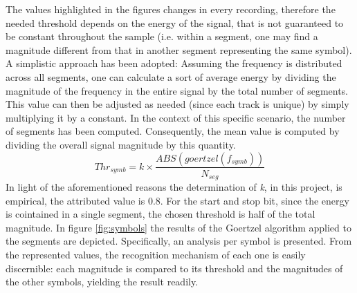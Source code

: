 The values highlighted in the figures changes in every recording, therefore the needed threshold depends on the energy of the signal, that is not guaranteed to be constant throughout the sample (i.e. within a segment, one may find a magnitude different from that in another segment representing the same symbol).
A simplistic approach has been adopted: Assuming the frequency is distributed across all segments, one can calculate a sort of average energy by dividing the magnitude of the frequency in the entire signal by the total number of segments. This value can then be adjusted as needed (since each track is unique) by simply multiplying it by a constant.
In the context of this specific scenario, the number of segments has been computed. Consequently, the mean value is computed by dividing the overall signal magnitude by this quantity. 
\[Thr_{symb} = k\times\frac{ABS(goertzel(f_{symb}))}{N_{seg}}\]
In light of the aforementioned reasons the determination of \textit{k}, in this project,  is empirical, the attributed value is 0.8. For the start and stop bit, since the energy is cointained in a single segment, the chosen threshold is half of the total magnitude.
In figure \ref{fig:symbols} the results of the Goertzel algorithm applied to the segments are depicted. Specifically, an analysis per symbol is presented. From the represented values, the recognition mechanism of each one is easily discernible: each magnitude is compared to its threshold and the magnitudes of the other symbols, yielding the result readily.
